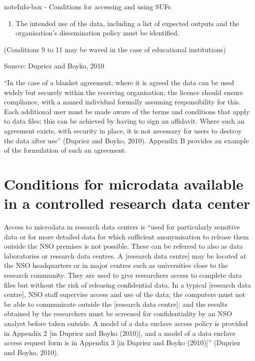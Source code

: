 \documentclass[letterpaper,10pt,english]{sphinxmanual}
\begin{document}
\begin{sphinxadmonition}{note}{Info-box - Conditions for accessing and using SUFs}
\begin{enumerate}
\item {} 
The intended use of the data, including a list of expected outputs and the organisation’s dissemination policy must be identified.

\end{enumerate}

(Conditions 9 to 11 may be waved in the case of educational institutions)

Source: Dupriez and Boyko, 2010
\end{sphinxadmonition}


“In the case of a blanket agreement, where it is agreed the data can be
used widely but securely within the receiving organisation, the licence
should ensure compliance, with a named individual formally assuming
responsibility for this. Each additional user must be made aware of the
terms and conditions that apply to data files: this can be achieved by
having to sign an affidavit. Where such an agreement exists, with
security in place, it is not necessary for users to destroy the data
after use” (Dupriez and Boyko, 2010). Appendix B provides an example of
the formulation of such an agreement.


\section{Conditions for microdata available in a controlled research data center}
\label{\detokenize{release_types:conditions-for-microdata-available-in-a-controlled-research-data-center}}
Access to microdata in research data centers is “used for particularly
sensitive data or for more detailed data for which sufficient
anonymisation to release them outside the NSO premises is not possible.
These can be referred to also as data laboratories or research data
centres. A {[}research data centre{]} may be located at the NSO headquarters
or in major centres such as universities close to the research
community. They are used to give researchers access to complete data
files but without the risk of releasing confidential data. In a typical
{[}research data centre{]}, NSO staff supervise access and use of the data;
the computers must not be able to communicate outside the {[}research data
centre{]}; and the results obtained by the researchers must be screened
for confidentiality by an NSO analyst before taken outside. A model of a
data enclave access policy is provided in Appendix 2 {[}in Dupriez and
Boyko (2010){]}, and a model of a data enclave access request form is in
Appendix 3 {[}in Dupriez and Boyko (2010){]}” (Dupriez and Boyko, 2010).
\end{document}
